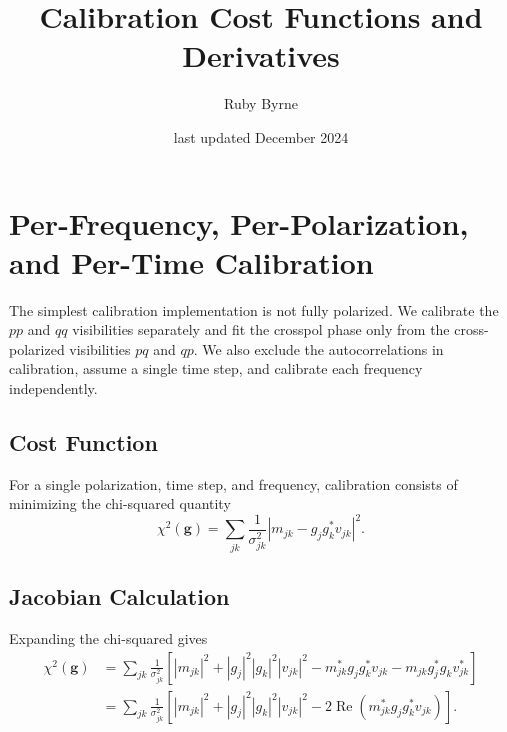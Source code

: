 \documentclass{article}
\title{Calibration Cost Functions and Derivatives}
\author{Ruby Byrne}
\date{last updated December 2024}
\newcommand\re{\operatorname{Re}}
\begin{document}
\maketitle

\section{Per-Frequency, Per-Polarization, and Per-Time Calibration}

The simplest calibration implementation is not fully polarized. We calibrate the $pp$ and $qq$ visibilities separately and fit the crosspol phase only from the cross-polarized visibilities $pq$ and $qp$. We also exclude the autocorrelations in calibration, assume a single time step, and calibrate each frequency independently.

\subsection{Cost Function}

For a single polarization, time step, and frequency, calibration consists of minimizing the chi-squared quantity
\begin{equation}
    \chi^2(\boldsymbol{g}) = \sum_{jk} \frac{1}{\sigma_{jk}^2} \left| m_{jk} - g_j g_k^* v_{jk} \right|^2.
\label{eq:skycal_cost_basic}
\end{equation}

\subsection{Jacobian Calculation}
\label{s:simplest_jac}

Expanding the chi-squared gives
\begin{equation}
\begin{split}
    \chi^2(\boldsymbol{g}) &= \sum_{jk} \frac{1}{\sigma_{jk}^2} \left[ |m_{jk}|^2 + |g_j|^2 |g_k|^2 |v_{jk}|^2 - m_{jk}^* g_j g_k^* v_{jk} - m_{jk} g_j^* g_k v_{jk}^* \right] \\
    &= \sum_{jk} \frac{1}{\sigma_{jk}^2} \left[ |m_{jk}|^2 + |g_j|^2 |g_k|^2 |v_{jk}|^2 - 2 \re \left( m_{jk}^* g_j g_k^* v_{jk} \right) \right].
\end{split}
\end{equation}
\end{document}
